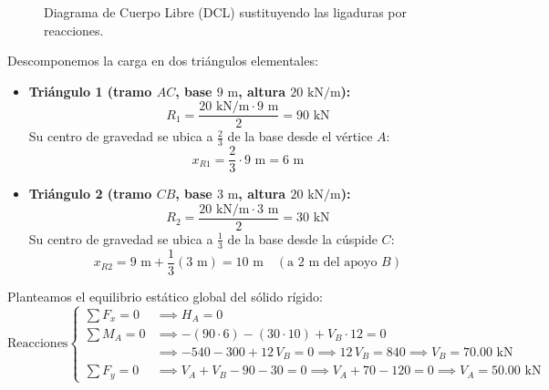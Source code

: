 \begin{figure}[H]
{%
    }
    \caption{Diagrama de Cuerpo Libre (DCL) sustituyendo las ligaduras por reacciones.}
    \label{fig:ejemplo5_dcl}
\end{figure}


Descomponemos la carga en dos triángulos elementales:
\begin{itemize}
    \item \textbf{Triángulo 1 (tramo $AC$, base $9\text{ m}$, altura $20\text{ kN/m}$):}
          \[
              R_1 = \frac{20\text{ kN/m} \cdot 9\text{ m}}{2} = 90\text{ kN}
          \]
          Su centro de gravedad se ubica a $\frac{2}{3}$ de la base desde el vértice $A$:
          \[
              x_{R1} = \frac{2}{3} \cdot 9\text{ m} = 6\text{ m}
          \]
    \item \textbf{Triángulo 2 (tramo $CB$, base $3\text{ m}$, altura $20\text{ kN/m}$):}
          \[
              R_2 = \frac{20\text{ kN/m} \cdot 3\text{ m}}{2} = 30\text{ kN}
          \]
          Su centro de gravedad se ubica a $\frac{1}{3}$ de la base desde la cúspide $C$:
          \[
              x_{R2} = 9\text{ m} + \frac{1}{3}(3\text{ m}) = 10\text{ m} \quad (\text{a } 2\text{ m del apoyo } B)
          \]
\end{itemize}

Planteamos el equilibrio estático global del sólido rígido:
\begin{equation}
    \text{Reacciones} \left\{
    \begin{aligned}
        \sum F_x = 0 & \implies \boxed{H_A = 0}                                                                            \\[6pt]
        \sum M_A = 0 & \implies -(90 \cdot 6) - (30 \cdot 10) + V_B \cdot 12 = 0                                           \\
                     & \implies -540 - 300 + 12\,V_B = 0 \implies 12\,V_B = 840 \implies \boxed{V_B = 70.00\text{ kN}}     \\[6pt]
        \sum F_y = 0 & \implies V_A + V_B - 90 - 30 = 0 \implies V_A + 70 - 120 = 0 \implies \boxed{V_A = 50.00\text{ kN}}
    \end{aligned}
    \right.
\end{equation}

